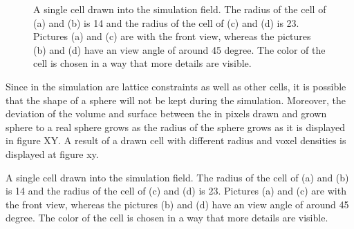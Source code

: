 \begin{figure}
\begin{center}
{	}
	\end{center}
	\caption{\label{img:DrawnSphereCellRadius5And9}A single cell drawn into the simulation field. The radius of the cell of (a) and (b) is 14 and the radius of the cell of (c) and (d) is 23. Pictures (a) and (c) are with the front view, whereas the
pictures (b) and (d) have an view angle of around 45 degree. The color of the cell is chosen in
a way that more details are visible.}
\end{figure}

Since in the simulation are lattice constraints as well as other cells, it is possible
that the shape of a sphere will not be kept during the simulation. Moreover, the
deviation of the volume and surface between the in pixels drawn and grown sphere
to a real sphere grows as the radius of the sphere grows as it is displayed in figure
XY. A result of a drawn cell with different radius and voxel densities is displayed
at figure xy.



A single cell drawn into the simulation field. The radius of the cell of (a) and (b) is 14 and the
radius of the cell of (c) and (d) is 23. Pictures (a) and (c) are with the front view, whereas the
pictures (b) and (d) have an view angle of around 45 degree. The color of the cell is chosen in
a way that more details are visible.